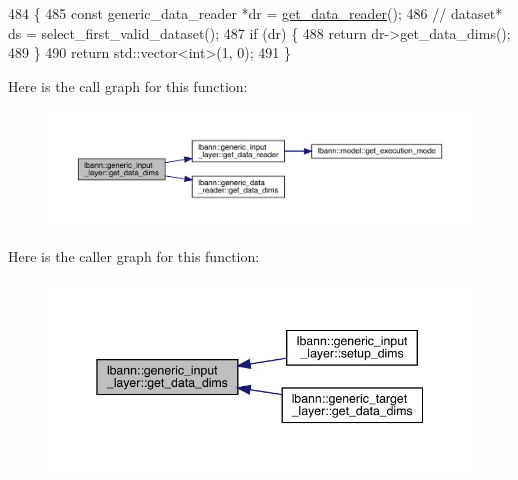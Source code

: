 \begin{DoxyCode}
484                                                       \{
485     \textcolor{keyword}{const} generic\_data\_reader *dr = \hyperlink{classlbann_1_1generic__input__layer_aba732becdb02627e3ad4493ac19e8fb6}{get\_data\_reader}();
486     \textcolor{comment}{//    dataset* ds = select\_first\_valid\_dataset();}
487     \textcolor{keywordflow}{if} (dr) \{
488       \textcolor{keywordflow}{return} dr->get\_data\_dims();
489     \}
490     \textcolor{keywordflow}{return} std::vector<int>(1, 0);
491   \}
\end{DoxyCode}
Here is the call graph for this function\+:\nopagebreak
\begin{figure}[H]
\begin{center}
\leavevmode
\includegraphics[width=350pt]{classlbann_1_1generic__input__layer_a6008b13521d27d6139201fa374b088eb_cgraph}
\end{center}
\end{figure}
Here is the caller graph for this function\+:\nopagebreak
\begin{figure}[H]
\begin{center}
\leavevmode
\includegraphics[width=345pt]{classlbann_1_1generic__input__layer_a6008b13521d27d6139201fa374b088eb_icgraph}
\end{center}
\end{figure}
\mbox{\label{classlbann_1_1generic__input__layer_a5715a966647e8cc92489f9e1950b2d28}} 
